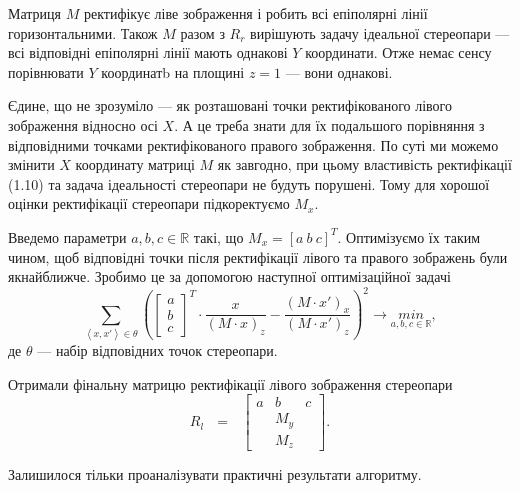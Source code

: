 Матриця $M$ ректифікує ліве зображення і робить всі епіполярні лінії
горизонтальними. Також $M$ разом з $R_r$ вирішують задачу ідеальної 
стереопари --- всі відповідні епіполярні лінії мають однакові $Y$ координати.
Отже немає сенсу порівнювати $Y$ координатb на площині $z=1$ --- вони 
однакові.

Єдине, що не зрозуміло --- як розташовані точки ректифікованого лівого
зображення відносно осі $X$. А це треба знати для їх подальшого порівняння
з відповідними точками ректифікованого правого зображення. По суті ми 
можемо змінити $X$ координату матриці $M$ як завгодно, при цьому властивість 
ректифікації (1.10) та задача ідеальності стереопари не будуть порушені. 
Тому для хорошої оцінки ректифікації стереопари підкоректуємо $M_x$. 

Введемо параметри $a, b, c \in \mathbb{R}$ такі, що $M_x = {[a \: b \: c]}^T$.
Оптимізуємо їх таким чином, щоб відповідні точки після ректифікації 
лівого та правого зображень були якнайближче. Зробимо це за допомогою 
наступної оптимізаційної задачі
\begin{equation}
\sum_{\left< x, x'\right> \in \theta}{\left (  
{\begin{bmatrix}
a \\ b \\ c
\end{bmatrix}}^T
\cdot
\frac{x}{{(M \cdot x)}_z}
-
\frac{{(M \cdot x')}_x}{{(M \cdot x')}_z}
\right )}^2
\to \underset{a, b, c \in \mathbb{R}}{min},
\end{equation}
де $\theta$ --- набір відповідних точок стереопари.

Отримали фінальну матрицю ректифікації лівого зображення стереопари
\begin{equation}
R_l \:\:\:  =  \:\:\:
\left[
\begin{matrix}
a & b & c\\
& M_y &\\
& M_z &\
\end{matrix}
\right].
\end{equation}

Залишилося тільки проаналізувати практичні результати алгоритму.

